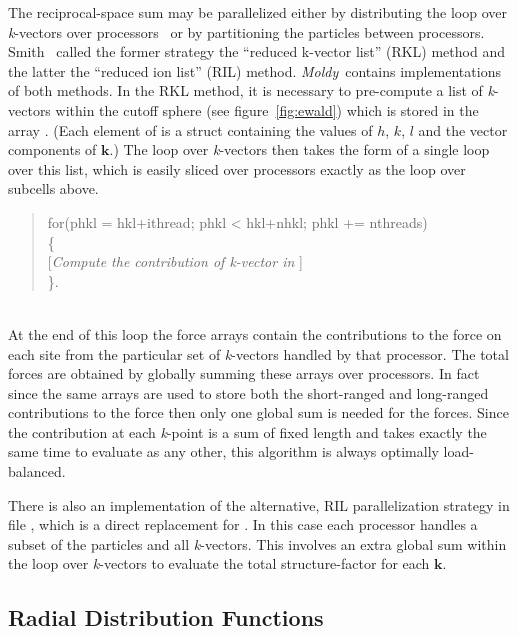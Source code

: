 \documentclass[a4paper,twoside]{report}
\providecommand{\bm}[1]{\mathbf{#1}}
\newcommand{\moldy}{\emph{Moldy}}
\begin{document}
The reciprocal-space sum may be parallelized either by distributing
the loop over \emph{k}-vectors over
processors~\cite{clementi:85,smith:92} or by partitioning the
particles between processors. Smith~\cite{smith:92} called the former
strategy the ``reduced k-vector list'' (RKL) method and the latter the
``reduced ion list'' (RIL) method.  \moldy\ contains implementations
of both methods.  In the RKL method, it is necessary to pre-compute a
list of \emph{k}-vectors within the cutoff sphere (see
figure~\ref{fig:ewald}) which is stored in the array .
(Each element of  is a struct containing the values of $h$,
$k$, $l$ and the vector components of $\bm{k}$.) The loop over
\emph{k}-vectors then takes the form of a single loop over this list,
which is easily sliced over processors exactly as the loop over
subcells above.\\
\parbox{\textwidth}{%
\begin{quote}
  \Litf
   for(phkl = hkl+ithread; phkl < hkl+nhkl; phkl += nthreads)\\
   \{\\
\hspace*{1cm}\textnormal{[\emph{Compute the contribution of
   \emph{k}-vector in} ]}\\
   \}.
\end{quote}}\\
At the end of this loop the force arrays contain the contributions to
the force on each site from the particular set of \emph{k}-vectors
handled by that processor.  The total forces are obtained by globally
summing these arrays over processors.  In fact since the same arrays are
used to store both the short-ranged and long-ranged contributions to
the force then only one global sum is needed for the forces.  Since
the contribution at each \emph{k}-point is a sum of fixed length and
takes exactly the same time to evaluate as any other, this algorithm
is always optimally load-balanced.

There is also an implementation of the alternative, RIL
parallelization strategy in file , which is a direct
replacement for .  In this case each processor handles a
subset of the particles and all \emph{k}-vectors.  This involves an
extra global sum within the loop over \emph{k}-vectors to evaluate
the total structure-factor for each $\bm{k}$.  

\subsection{Radial Distribution Functions}
\end{document}
